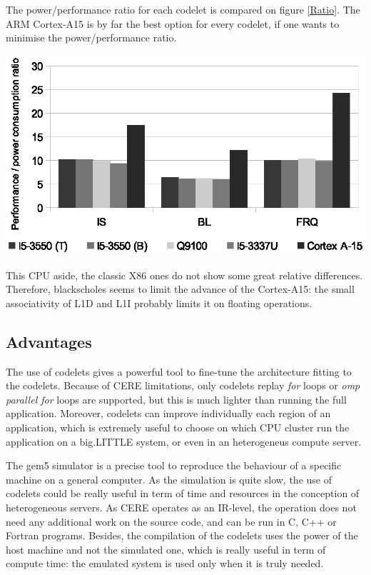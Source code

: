 \documentclass{article}
\newenvironment{Figure}
  {\par\medskip\noindent\center\minipage{0.9\linewidth}}
  {\endminipage\par\bigskip\medskip}
\begin{document}
\begin{multicols}{2}
The power/performance ratio for each codelet is compared on figure \ref{Ratio}. The ARM Cortex-A15 is by far the best option for every codelet, if one wants to minimise the power/performance ratio.

\begin{Figure}
\centering
\includegraphics[width=\linewidth]{Ratio.eps}
\end{Figure}

This CPU aside, the classic X86 ones do not show some great relative differences. Therefore, blackscholes seems to limit the advance of the Cortex-A15: the small associativity of L1D and L1I probably limits it on floating operations.


\subsection{Advantages}
The use of codelets gives a powerful tool to fine-tune the architecture fitting to the codelets. Because of CERE limitations, only codelets replay \textit{for} loops or \textit{omp parallel for} loops are supported, but this is much lighter than running the full application. Moreover, codelets can improve individually each region of an application, which is extremely useful to choose on which CPU cluster run the application on a big.LITTLE system, or even in an heterogeneus compute server.

The gem5 simulator is a precise tool to reproduce the behaviour of a specific machine on a general computer. As the simulation is quite slow, the use of codelets could be really useful in term of time and resources in the conception of heterogeneous servers. As CERE operates as an IR-level, the operation does not need any additional work on the source code, and can be run in C, C++ or Fortran programs. Besides, the compilation of the codelets uses the power of the host machine and not the simulated one, which is really useful in term of compute time: the emulated system is used only when it is truly needed.


\end{multicols}
\end{document}
